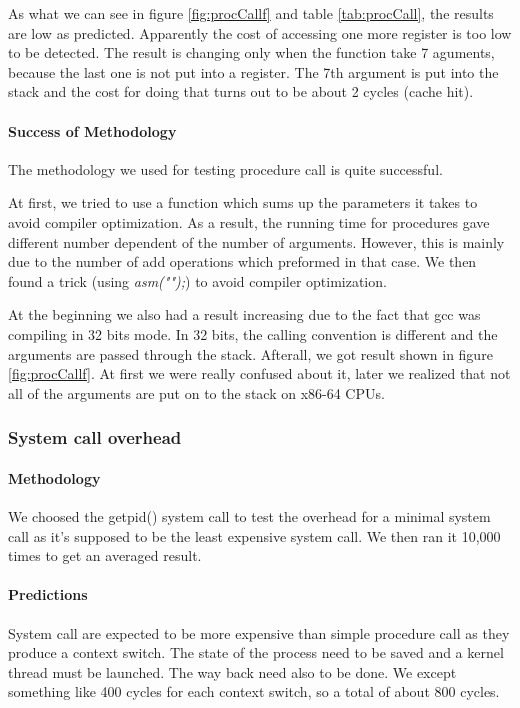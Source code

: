 As what we can see in figure \ref{fig:procCallf} and table \ref{tab:procCall}, the results are low as predicted.
Apparently the cost of accessing one more register is too low to be detected.
The result is changing only when the function take 7 aguments, because the last
one is not put into a register.
The 7th argument is put into the stack and the cost for doing that turns out to
be about 2 cycles (cache hit).

\paragraph{Success of Methodology}
The methodology we used for testing procedure call is quite successful.

At first, we tried to use a function which sums up the parameters it takes to
avoid compiler optimization.
As a result, the running time for procedures gave different number dependent of
the number of arguments.
However, this is mainly due to the number of add operations which preformed in that case.
We then found a trick (using \emph{asm("");}) to avoid compiler optimization.

At the beginning we also had a result increasing due to the fact that gcc was
compiling in 32 bits mode.
In 32 bits, the calling convention is different and the arguments are passed
through the stack.
Afterall, we got result shown in figure \ref{fig:procCallf}.
At first we were really confused about it, later we realized that not all of
the arguments are put on to the stack on x86-64 CPUs.




\subsubsection{System call overhead}
\paragraph{Methodology}
We choosed the getpid() system call to test the overhead for a minimal system
call as it's supposed to be the least expensive system call.
We then ran it 10,000 times to get an averaged result.

\paragraph{Predictions}
System call are expected to be more expensive than simple procedure call as they
produce a context switch.
The state of the process need to be saved and a kernel thread must be launched.
The way back need also to be done.
We except something like 400 cycles for each context switch, so a total of about 800 cycles.

